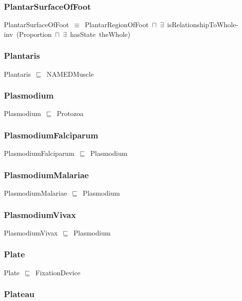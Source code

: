 \documentclass{article}
\begin{document}
\subsubsection*{PlantarSurfaceOfFoot}

PlantarSurfaceOfFoot~\ensuremath{\equiv}~PlantarRegionOfFoot~\ensuremath{\sqcap}~\ensuremath{\exists}~isRelationshipToWhole-inv~(Proportion~\ensuremath{\sqcap}~\ensuremath{\exists}~hasState~theWhole)

\subsubsection*{Plantaris}

Plantaris~\ensuremath{\sqsubseteq}~NAMEDMuscle~

\subsubsection*{Plasmodium}

Plasmodium~\ensuremath{\sqsubseteq}~Protozoa~

\subsubsection*{PlasmodiumFalciparum}

PlasmodiumFalciparum~\ensuremath{\sqsubseteq}~Plasmodium~

\subsubsection*{PlasmodiumMalariae}

PlasmodiumMalariae~\ensuremath{\sqsubseteq}~Plasmodium~

\subsubsection*{PlasmodiumVivax}

PlasmodiumVivax~\ensuremath{\sqsubseteq}~Plasmodium~

\subsubsection*{Plate}

Plate~\ensuremath{\sqsubseteq}~FixationDevice~

\subsubsection*{Plateau}
\end{document}
